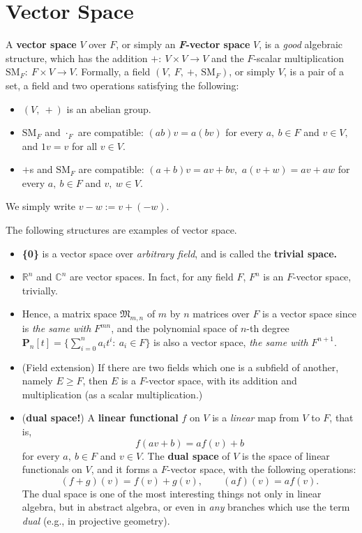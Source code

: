\section{Vector Space}
\begin{defn}
A \textbf{vector space} $V$ over $F$, or simply an \textbf{\textit{F}-vector space} $V$, is a \textit{good} algebraic structure, which has the addition $+:~V\times V \to V$ and the $F$-scalar multiplication $\mathrm{SM}_F:~F\times V \to V$. Formally, a field $(V,~F,~+,~\mathrm{SM}_F)$, or simply $V$, is a pair of a set, a field and two operations satisfying the following:
\begin{itemize}
\item $(V,~ +)$ is an abelian group.
\item $\mathrm{SM}_F$ and $\cdot_F$ are compatible: $(ab)v = a(bv)$ for every $a, ~b \in F$ and $v\in V,$ and $1v = v$ for all $v\in V.$
\item $+$s and $\mathrm{SM}_F$ are compatible: $(a+b)v = av + bv,$ $a(v+w) = av + aw$ for every $a,~b\in F$ and $v,~w \in V.$
\end{itemize}
We simply write $v-w := v+(-w).$
\end{defn}
\begin{ex} The following structures are examples of vector space.
\begin{itemize}
\item \textbf{\{0\}} is a vector space over \textit{arbitrary field}, and is called the \textbf{trivial space.}
\item $\mathbb R^n$ and $\mathbb C^n$ are vector spaces. In fact, for any field $F$, $F^n$ is an $F$-vector space, trivially.
\item Hence, a matrix space $\mathfrak M_{m,n}$ of $m$ by $n$ matrices over $F$ is a vector space since is \textit{the same with} $F^{mn}$, and the polynomial space of $n$-th degree $\mathbf{P}_n [t] = \{\sum_{i=0}^n a_i t^i: ~ a_i \in F\}$ is also a vector space, \textit{the same with} $F^{n+1}.$
\item (Field extension) If there are two fields which one is a subfield of another, namely $E \ge F$, then $E$ is a $F$-vector space, with its addition and multiplication (as a scalar multiplication.)
\item (\textbf{dual space!}) A \textbf{linear functional} $f$ on $V$ is a \textit{linear} map from $V$ to $F$, that is, $$f(av+b) = af(v)+b$$ for every $a,~b\in F$ and $v\in V.$ The \textbf{dual space} of $V$ is the space of linear functionals on $V$, and it forms a $F$-vector space, with the following operations: $$(f+g)(v) = f(v) + g(v),\qquad (af)(v) = af(v).$$ The dual space is one of the most interesting things not only in linear algebra, but in abstract algebra, or even in \textit{any} branches which use the term \textit{dual} (e.g., in projective geometry).
\end{itemize}
\end{ex}


